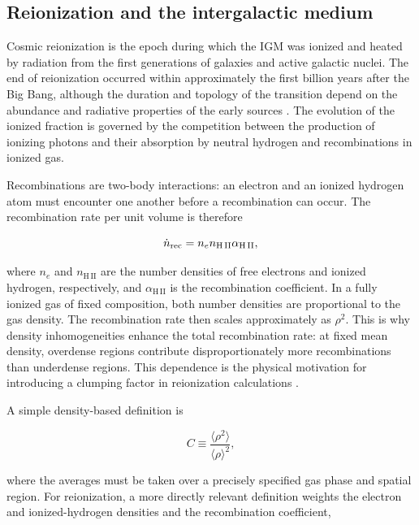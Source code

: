 \documentclass[%
 reprint,
nofootinbib,
 amsmath,amssymb,
 aps,
]{revtex4-2}
\begin{document}
\subsection{Reionization and the intergalactic medium}

Cosmic reionization is the epoch during which the IGM was ionized and heated by radiation from the first generations of galaxies and active galactic nuclei. The end of reionization occurred within approximately the first billion years after the Big Bang, although the duration and topology of the transition depend on the abundance and radiative properties of the early sources \cite{feng2019reionization}. The evolution of the ionized fraction is governed by the competition between the production of ionizing photons and their absorption by neutral hydrogen and recombinations in ionized gas.

Recombinations are two-body interactions: an electron and an ionized hydrogen atom must encounter one another before a recombination can occur. The recombination rate per unit volume is therefore

\begin{equation}
\dot n_{\rm rec}=n_e n_{\mathrm{H\,II}}\alpha_{\mathrm{H\,II}},
\end{equation}

where $n_e$ and $n_{\mathrm{H\,II}}$ are the number densities of free electrons and ionized hydrogen, respectively, and $\alpha_{\mathrm{H\,II}}$ is the recombination coefficient. In a fully ionized gas of fixed composition, both number densities are proportional to the gas density. The recombination rate then scales approximately as $\rho^2$. This is why density inhomogeneities enhance the total recombination rate: at fixed mean density, overdense regions contribute disproportionately more recombinations than underdense regions. This dependence is the physical motivation for introducing a clumping factor in reionization calculations \cite{feng2019reionization,davies2024clumping}.

A simple density-based definition is

\begin{equation}
C \equiv \frac{\langle \rho^2 \rangle}{\langle \rho \rangle^2},
\end{equation}

where the averages must be taken over a precisely specified gas phase and spatial region. For reionization, a more directly relevant definition weights the electron and ionized-hydrogen densities and the recombination coefficient,
\end{document}
